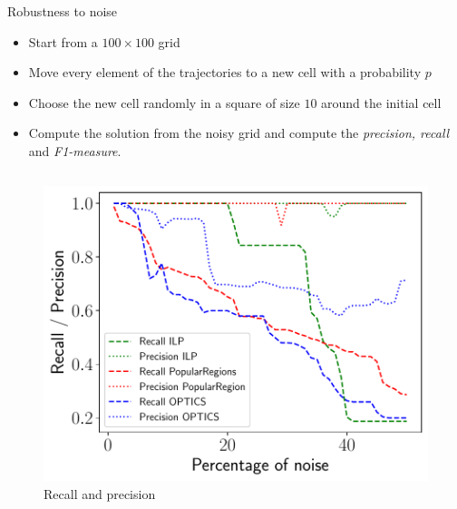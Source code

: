 \documentclass[10pt]{beamer}
\begin{document}
\begin{frame}{Robustness to noise}
    \begin{itemize}
        \item Start from a $100 \times 100$ grid
        \item Move every element of the trajectories to a new cell with a probability $p$
        \item Choose the new cell randomly in a square of size $10$ around the initial cell
        \item Compute the solution from the noisy grid and compute the \emph{precision, recall} and \emph{F1-measure}.

    \end{itemize}
    \begin{columns}[T, onlytextwidth]

        \begin{figure}
            \centering
            \includegraphics[scale=0.3]{figures/results/recall-precision.pdf}
            \caption{Recall and precision}
        \end{figure}


\end{columns}
\end{frame}
\end{document}
